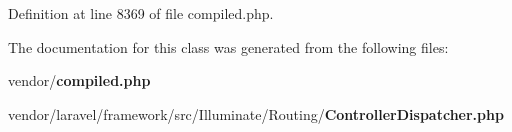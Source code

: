 Definition at line 8369 of file compiled.\+php.



The documentation for this class was generated from the following files\+:\begin{DoxyCompactItemize}
\item 
vendor/{\bf compiled.\+php}\item 
vendor/laravel/framework/src/\+Illuminate/\+Routing/{\bf Controller\+Dispatcher.\+php}\end{DoxyCompactItemize}
